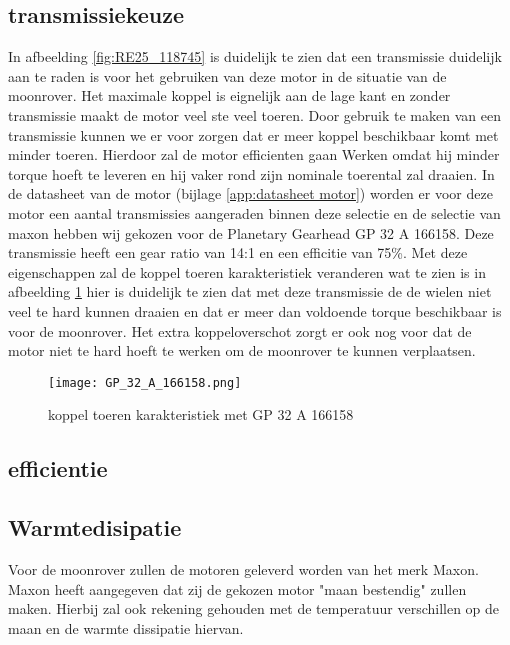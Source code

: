 \subsection{transmissiekeuze}
In afbeelding \ref{fig:RE25_118745} is duidelijk te zien dat een transmissie duidelijk aan te raden is voor het gebruiken van deze motor in de situatie van de moonrover. Het maximale koppel is eignelijk aan de lage kant en zonder transmissie maakt de motor veel ste veel toeren. Door gebruik te maken van een transmissie kunnen we er voor zorgen dat er meer koppel beschikbaar komt met minder toeren. Hierdoor zal de motor efficienten gaan Werken omdat hij minder torque hoeft te leveren en hij vaker rond zijn nominale toerental zal draaien. In de datasheet van de  motor (bijlage \ref{app:datasheet motor}) worden er voor deze motor een aantal transmissies aangeraden binnen deze selectie en de selectie van maxon hebben wij gekozen voor de Planetary Gearhead GP 32 A 166158. Deze transmissie heeft een gear ratio van 14:1 en een efficitie van 75\%. Met deze eigenschappen zal de koppel toeren karakteristiek veranderen wat te zien is in afbeelding \ref{fig:GP 32 A 166158} hier is duidelijk te zien dat met deze transmissie de de wielen niet veel te hard kunnen draaien en dat er meer dan voldoende torque beschikbaar is voor de moonrover. Het extra koppeloverschot zorgt er ook nog voor dat de motor niet te hard hoeft te werken om de moonrover te kunnen verplaatsen.

        \begin{figure}[H]
                \centering
                \texttt{[image: GP\_32\_A\_166158.png]}
                \caption{koppel toeren karakteristiek met GP 32 A 166158}
                \label{fig:GP 32 A 166158}
        \end{figure}

\subsection{efficientie}


\subsection{Warmtedisipatie}

Voor de moonrover zullen de motoren geleverd worden van het merk Maxon. Maxon heeft aangegeven dat zij de gekozen motor "maan bestendig" zullen maken. Hierbij zal ook rekening gehouden met de temperatuur verschillen op de maan en de warmte dissipatie hiervan. 